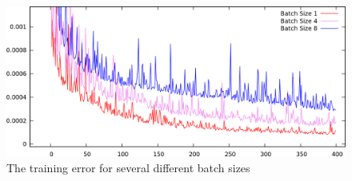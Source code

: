 \documentclass[11pt, a4paper]{article}
\begin{document}
\begin{figure}[h!]
	\centering
	\includegraphics[width=\textwidth]{results/cnn_batchsizes.png}
	\caption{The training error for several different batch sizes}
	\label{fig:cnn_batchsize}
\end{figure}
\end{document}
